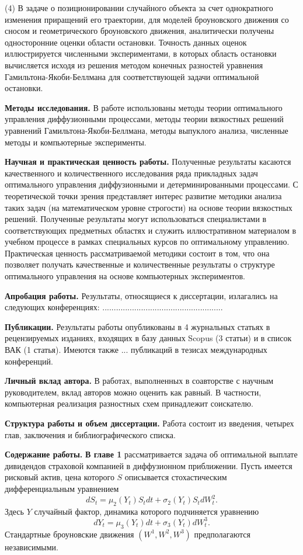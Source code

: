 (4) В задаче о позиционировании случайного объекта за счет однократного изменения приращений его траектории, для моделей броуновского движения со сносом и геометрического броуновского движения, аналитически получены односторонние оценки области остановки. Точность данных оценок иллюстрируется численными экспериментами, в которых область остановки вычисляется исходя из решения методом конечных разностей уравнения Гамильтона-Якоби-Беллмана для соответствующей задачи оптимальной остановки. 

\textbf{Методы исследования.} В работе использованы методы теории оптимального управления диффузионными процессами, методы теории вязкостных решений уравнений Гамильтона-Якоби-Беллмана, методы выпуклого анализа, численные методы и компьютерные эксперименты. 

\textbf{Научная и практическая ценность работы.} Полученные результаты касаются качественного и количественного исследования ряда прикладных задач оптимального управления диффузионными и детерминированными процессами. С теоретической точки зрения представляет интерес развитие методики анализа таких задач (на математическом уровне строгости) на основе теории вязкостных решений. Полученные результаты могут использоваться специалистами в соответствующих предметных областях и служить иллюстративном материалом в учебном процессе в рамках специальных курсов по оптимальному управлению. Практическая ценность рассматриваемой методики состоит в том, что она позволяет получать качественные и количественные результаты о структуре оптимального управления на основе компьютерных экспериментов.

\textbf{Апробация работы.} Результаты, относящиеся к диссертации, излагались на следующих конференциях:
.....................................................

\textbf{Публикации.} Результаты работы опубликованы в 4 журнальных статьях в рецензируемых изданиях, входящих в базу данных Scopus (3 статьи) и в список ВАК (1 статья). Имеются также ... публикаций в тезисах международных конференций. 

\textbf{Личный вклад автора.} В работах, выполненных в соавторстве с научным руководителем, вклад авторов можно оценить как равный. В частности, компьютерная реализация разностных схем принадлежит соискателю. 

\textbf{Структура работы и объем диссертации.} Работа состоит из введения, четырех глав, заключения и библиографического списка. 

\textbf{Содержание работы.}
\textbf{В главе 1} рассматривается задача об оптимальной выплате дивидендов страховой компанией в диффузионном приближении.
Пусть имеется рисковый актив, цена которого $S$ описывается стохастическим дифференциальным уравнением
\begin{equation} \label{eq:1.1.2}
dS_t= \mu_2 (Y_t) S_t dt +\sigma_2 (Y_t) S_t d W^2_t.
\end{equation}
Здесь $Y$ случайный фактор, динамика которого подчиняется уравнению
\begin{equation} \label{eq:1.1.3}
dY_t=\mu_3(Y_t)dt+\sigma_3 (Y_t) d W_t^3.
\end{equation}
Стандартные броуновские движения $(W^1,W^2,W^3)$ предполагаются независимыми.

